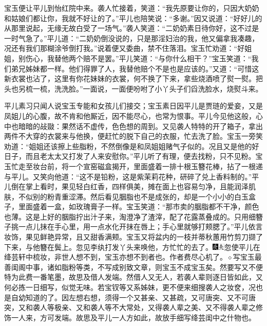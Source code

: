 宝玉便让平儿到怡红院中来。袭人忙接着，笑道：“我先原要让你的，只因大奶奶和姑娘们都让你，我就不好让的了。”平儿也陪笑说：“多谢。”因又说道：“好好儿的从那里说起，无缘无故白受了一场气。”袭人笑道：“二奶奶素日待你好，这不过是一时气急了。”平儿道：“二奶奶倒没说的，只是那淫妇治的我，他又偏拿我凑趣，况还有我们那糊涂爷倒打我。”说着便又委曲，禁不住落泪。宝玉忙劝道：“好姐姐，别伤心，我替他两个赔不是罢。”平儿笑道：“与你什么相干？”宝玉笑道：“我们弟兄姊妹都一样。他们得罪了人，我替他赔个不是也是应该的。”又道：“可惜这新衣裳也沾了，这里有你花妹妹的衣裳，何不换了下来，拿些烧酒喷了熨一熨。把头也另梳一梳，洗洗脸。”一面说，一面便吩咐了小丫头子们舀洗脸水，烧熨斗来。

平儿素习只闻人说宝玉专能和女孩儿们接交；宝玉素日因平儿是贾琏的爱妾，又是凤姐儿的心腹，故不肯和他厮近，因不能尽心，也常为恨事。平儿今见他这般，心中也暗暗的敁敠：果然话不虚传，色色想的周到。又见袭人特特的开了箱子，拿出两件不大穿的衣裳来与他换，便赶忙的脱下自己的衣服，忙去洗了脸。宝玉一旁笑劝道：“姐姐还该擦上些脂粉，不然倒像是和凤姐姐赌气子似的。况且又是他的好日子，而且老太太又打发了人来安慰你。”平儿听了有理，便去找粉，只不见粉。宝玉忙走至妆台前，将一个宣窑磁盒揭开，里面盛着一排十根玉簪花棒，拈了一根递与平儿。又笑向他道：“这不是铅粉，这是紫茉莉花种，研碎了兑上香料制的。”平儿倒在掌上看时，果见轻白红香，四样俱美，摊在面上也容易匀净，且能润泽肌肤，不似别的粉青重涩滞。然后看见胭脂也不是成张的，却是一个小小的白玉盒子，里面盛着一盒，如玫瑰膏子一样。宝玉笑道：“那市卖的胭脂都不干净，颜色也薄。这是上好的胭脂拧出汁子来，淘澄净了渣滓，配了花露蒸叠成的。只用细簪子挑一点儿抹在手心里，用一点水化开抹在唇上；手心里就够打颊腮了。”平儿依言妆饰，果见鲜艳异常，且又甜香满颊。宝玉又将盆内的一枝并蒂秋蕙用竹剪刀撷了下来，与他簪在鬓上。忽见李纨打发丫头来唤他，方忙忙的去了。{\includegraphics[width=3mm]{../Images/00004}\includegraphics[width=3mm]{../Images/00012}\footnotesize \kaishu 忽使平儿在绛芸轩中梳妆，非世人想不到，宝玉亦想不到者也。作者费尽心机了。{$\diamond$}写宝玉最善闺阁中事，诸如脂粉等类，不写成别致文章，则宝玉不成宝玉矣。然要写又不便特为此费一番笔墨，故思及借人发端。然借人又无人，若袭人辈则逐日皆如此，又何必拣一日细写，似觉无味。若宝钗等又系姊妹，更不便来细搜袭人之妆奁，况也是自幼知道的了。因左想右想，须得一个又甚亲、又甚疏，又可唐突、又不可唐突，又和袭人等极亲、又和袭人等不大常处，又得袭人辈之美、又不得袭人辈之修饰一人来，方可发端。故思及平儿一人方如此，故放手细写绛芸闺中之什物也。}

